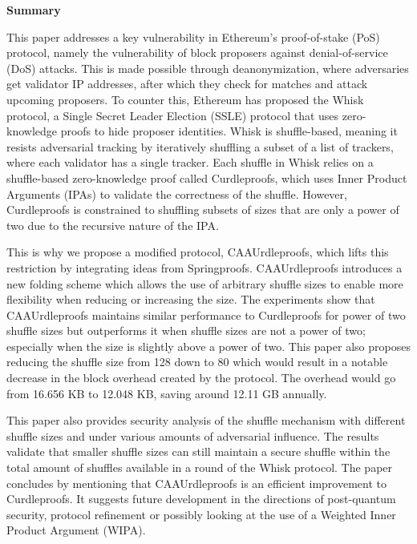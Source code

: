 \onecolumn     %
\thispagestyle{empty}

\begin{center}
    \begin{tcolorbox}[
        width=\dimexpr\paperwidth - 2in\relax,  %
        colback=white,                          %
        colframe=white,                         %
        left=60pt, right=60pt, top=10pt, bottom=10pt, %
        boxrule=0.8pt, %
        fontupper=\large
    ]
        \textbf{\large Summary}%

This paper addresses a key vulnerability in Ethereum’s proof-of-stake (PoS) protocol, namely the vulnerability of block proposers against denial-of-service (DoS) attacks.
This is made possible through deanonymization, where adversaries get validator IP addresses, after which they check for matches and attack upcoming proposers.
To counter this, Ethereum has proposed the Whisk protocol, a Single Secret Leader Election (SSLE) protocol that uses zero-knowledge proofs to hide proposer identities.
Whisk is shuffle-based, meaning it resists adversarial tracking by iteratively shuffling a subset of a list of trackers, where each validator has a single tracker.
Each shuffle in Whisk relies on a shuffle-based zero-knowledge proof called Curdleproofs, which uses Inner Product Arguments (IPAs) to validate the correctness of the shuffle.
However, Curdleproofs is constrained to shuffling subsets of sizes that are only a power of two due to the recursive nature of the IPA.


This is why we propose a modified protocol, CAAUrdleproofs, which lifts this restriction by integrating ideas from Springproofs.
CAAUrdleproofs introduces a new folding scheme which allows the use of arbitrary shuffle sizes to enable more flexibility when reducing or increasing the size.
The experiments show that CAAUrdleproofs maintains similar performance to Curdleproofs for power of two shuffle sizes but outperforms it when shuffle sizes are not a power of two; especially when the size is slightly above a power of two.
This paper also proposes reducing the shuffle size from 128 down to 80 which would result in a notable decrease in the block overhead created by the protocol.
The overhead would go from 16.656 KB to 12.048 KB, saving around 12.11 GB annually.


This paper also provides security analysis of the shuffle mechanism with different shuffle sizes and under various amounts of adversarial influence.
The results validate that smaller shuffle sizes can still maintain a secure shuffle within the total amount of shuffles available in a round of the Whisk protocol.
The paper concludes by mentioning that CAAUrdleproofs is an efficient improvement to Curdleproofs.
It suggests future development in the directions of post-quantum security, protocol refinement or possibly looking at the use of a Weighted Inner Product Argument (WIPA).



        \end{tcolorbox}
    \end{center}